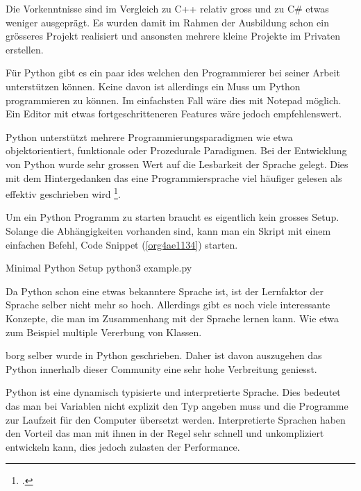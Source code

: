 Die Vorkenntnisse sind im Vergleich zu C++ relativ gross und zu C\# etwas
weniger ausgeprägt. Es wurden damit im Rahmen der Ausbildung schon ein
grösseres Projekt realisiert und ansonsten mehrere kleine Projekte im Privaten
erstellen.

Für Python gibt es ein paar \glspl{ide} welchen den Programmierer bei seiner
Arbeit unterstützen können. Keine davon ist allerdings ein Muss um Python
programmieren zu können. Im einfachsten Fall wäre dies mit Notepad möglich. Ein
Editor mit etwas fortgeschritteneren Features wäre jedoch empfehlenswert.

Python unterstützt mehrere Programmierungsparadigmen wie etwa
objektorientiert, funktionale oder Prozedurale Paradigmen. Bei der Entwicklung
von Python wurde sehr grossen Wert auf die Lesbarkeit der Sprache gelegt. Dies
mit dem Hintergedanken das eine Programmiersprache viel häufiger gelesen als
effektiv geschrieben wird \footcite{pep8}.

Um ein Python Programm zu starten braucht es eigentlich kein grosses Setup.
Solange die Abhängigkeiten vorhanden sind, kann man ein Skript mit einem
einfachen Befehl, Code Snippet (\ref{org4ae1134}) starten.

\begin{sexylisting}{Minimal Python Setup}
python3 example.py
\end{sexylisting}

Da Python schon eine etwas bekanntere Sprache ist, ist der Lernfaktor der
Sprache selber nicht mehr so hoch. Allerdings gibt es noch viele interessante
Konzepte, die man im Zusammenhang mit der Sprache lernen kann. Wie etwa zum
Beispiel multiple Vererbung von Klassen.

\gls{borg} selber wurde in Python geschrieben. Daher ist davon auszugehen das
Python innerhalb dieser Community eine sehr hohe Verbreitung geniesst.

Python ist eine dynamisch typisierte und interpretierte Sprache. Dies bedeutet
das man bei Variablen nicht explizit den Typ angeben muss und die Programme zur
Laufzeit für den Computer übersetzt werden. Interpretierte Sprachen haben den
Vorteil das man mit ihnen in der Regel sehr schnell und unkompliziert
entwickeln kann, dies jedoch zulasten der Performance.

